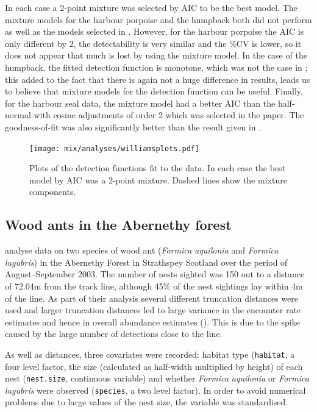 In each case a 2-point mixture was selected by AIC to be the best model. The mixture models for the harbour porpoise and the humpback both did not perform as well as the models selected in . However, for the harbour porpoise the AIC is only different by 2, the detectability is very similar and the \%CV is lower, so it does not appear that much is lost by using the mixture model. In the case of the humpback, the fitted detection function is monotone, which was not the case in ; this added to the fact that there is again not a huge difference in results, leads us to believe that mixture models for the detection function can be useful. Finally, for the harbour seal data, the mixture model had a better AIC than the half-normal with cosine adjustments of order 2 which was selected in the paper. The goodness-of-fit was also significantly better than the result given in .

\begin{figure}
\centering
\texttt{[image: mix/analyses/williamsplots.pdf]}
\caption{Plots of the detection functions fit to the  data. In each case the best model by AIC was a 2-point mixture. Dashed lines show the mixture components.}
\label{williams-detfcts}
\end{figure}


\subsection{Wood ants in the Abernethy forest}

 analyse data on two species of wood ant (\textit{Formica aquilonia} and \textit{Formica lugubris}) in the Abernethy Forest in Strathspey Scotland over the period of August--September 2003. The number of nests sighted was 150 out to a distance of 72.04m from the track line, although 45\% of the nest sightings lay within 4m of the line. As part of their analysis several different truncation distances were used and larger truncation distances led to large variance in the encounter rate estimates and hence in overall abundance estimates (\cite{ants}). This is due to the spike caused by the large number of detections close to the line.

As well as distances, three covariates were recorded: habitat type (\texttt{habitat}, a four level factor, the size (calculated as half-width multiplied by height) of each nest (\texttt{nest.size}, continuous variable) and whether \textit{Formica aquilonia} or \textit{Formica lugubris} were observed (\texttt{species}, a two level factor). In order to avoid numerical problems due to large values of the nest size, the variable was standardised.

